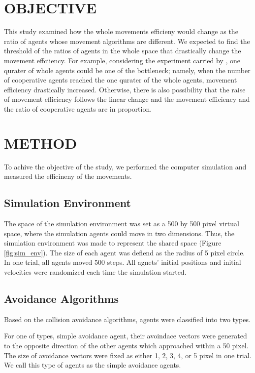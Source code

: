 \documentclass[letterpaper, 10 pt, conference]{ieeeconf}  %
\begin{document}
\section{OBJECTIVE}
This study examined how the whole movements efficieny would change as the ratio of agents whose movement algorithms are different. We expected to find the threshold of the ratios of agents in the whole space that drastically change the movement effciiency. For example, considering the experiment carried by \cite{c2}, one qurater of whole agents could be one of the bottleneck; namely, when the number of cooperative agents reached the one qurater of the whole agents, movement efficiency drastically increased. Otherwise, there is also possibility that the raise of movement efficiency follows the linear change and the movement efficiency and the ratio of cooperative agents are in proportion. 

\section{METHOD}
To achive the objective of the study, we performed the computer simulation and measured the efficineny of the movements.  

\subsection{Simulation Environment}
The space of the simulation environment was set as a 500 by 500 pixel virtual space, where the simulation agents could move in two dimensions. Thus, the simulation environment was made to represent the shared space (Figure \ref{fig:sim_env}). The size of each agent was defiend as the radius of 5 pixel circle. In one trial, all agents moved 500 steps. All agnets' initial positions and initial velocities were randomized each time the simulation started.

\subsection{Avoidance Algorithms}
Based on the collision avoidance algorithms, agents were classified into two types.

For one of types, simple avoidance agent, their avoindace vectors were generated to the opposite direction of the other agents which approached within a 50 pixel. The size of avoidance vectors were fixed as either 1, 2, 3, 4, or 5 pixel in one trial. We call this type of agents as the simple avoidance agents.
\end{document}
